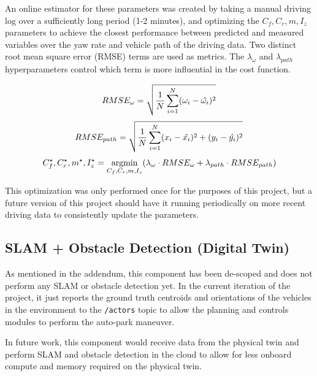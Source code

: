 An online estimator for these parameters was created by taking a manual driving log over a sufficiently long period (1-2 minutes), and optimizing the $C_f, C_r, m, I_z$ parameters to achieve the closest performance between predicted and measured variables over the yaw rate and vehicle path of the driving data. Two distinct root mean square error (RMSE) terms are used as metrics. The $\lambda_\omega$ and $\lambda_{path}$ hyperparameters control which term is more influential in the cost function.

\begin{equation}
\label{rmse_omega}
RMSE_{\omega} = \sqrt{\frac{1}{N} \sum_{i=1}^N (\omega_{i} - \hat{\omega_{i}})^2}\\
\end{equation}
\begin{equation}
\label{rmse_path}
RMSE_{path} = \sqrt{\frac{1}{N} \sum_{i=1}^N (x_{i} - \hat{x_{i}})^2 + (y_{i} - \hat{y_{i}})^2}\\
\end{equation}
\begin{equation}
\label{cornering_stiffness_cost_function}
C_f^{\star}, C_r^{\star}, m^\star, I_z^\star = \underset{C_f, C_r, m, I_z}{\mathrm{argmin}} (\lambda_{\omega} \cdot RMSE_{\omega} + \lambda_{path} \cdot RMSE_{path})\\
\end{equation}

This optimization was only performed once for the purposes of this project, but a future version of this project should have it running periodically on more recent driving data to consistently update the parameters.

\subsection{SLAM + Obstacle Detection (Digital Twin)}

As mentioned in the addendum, this component has been de-scoped and does not perform any SLAM or obstacle detection yet. In the current iteration of the project, it just reports the ground truth centroids and orientations of the vehicles in the environment to the \verb|/actors| topic to allow the planning and controls modules to perform the auto-park maneuver.

In future work, this component would receive data from the physical twin and perform SLAM and obstacle detection in the cloud to allow for less onboard compute and memory required on the physical twin.


